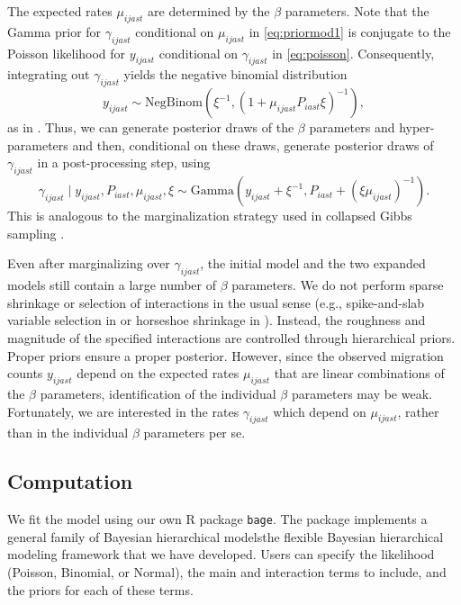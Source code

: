 \documentclass{article}
\begin{document}
{\color{magenta}The expected rates $\mu_{ijast}$ are determined by the $\beta$ parameters. Note that the Gamma prior for 
$\gamma_{ijast}$ conditional on $\mu_{ijast}$ in \eqref{eq:priormod1} is conjugate to the Poisson likelihood for $y_{ijast}$ conditional on $\gamma_{ijast}$ in \eqref{eq:poisson}. Consequently, integrating out $\gamma_{ijast}$ yields the negative binomial distribution
\begin{equation}\label{eq:negbinom}
  y_{ijast} \sim \text{NegBinom}\left(\xi^{-1}, (1 + \mu_{ijast} P_{iast} \xi)^{-1}\right),
\end{equation}
as in \citet{norton2018sampling}. Thus, we can generate posterior draws of the $\beta$ parameters and hyper-parameters and then, conditional on these draws, generate posterior draws of $\gamma_{ijast}$ in a post-processing step, using
\begin{equation}\label{eq:generate_gamma}
  \gamma_{ijast} \mid y_{ijast}, P_{iast}, \mu_{ijast}, \xi \sim \text{Gamma}\left(y_{ijast} + \xi^{-1}, P_{iast} + (\xi \mu_{ijast})^{-1}\right).
\end{equation}
This is analogous to the marginalization strategy used in collapsed Gibbs sampling \citep{liu1994collapsed}.}

{\color{magenta}Even after marginalizing over $\gamma_{ijast}$, the initial model and the two expanded models still contain a large number of $\beta$ parameters. We do not perform sparse shrinkage or selection of interactions in the usual sense (e.g., spike-and-slab variable selection in \cite{george1993variable} or horseshoe shrinkage in \cite{carvalho2010horseshoe}). Instead, the roughness and magnitude of the specified interactions are controlled through hierarchical priors. Proper priors ensure a proper posterior. However, since the observed migration counts $y_{ijast}$ depend on the expected rates $\mu_{ijast}$  that are linear combinations of the $\beta$ parameters,  identification of the individual $\beta$ parameters may be weak.  Fortunately, we are interested in the rates $\gamma_{ijast}$ which depend on $\mu_{ijast}$, rather than in the individual $\beta$ parameters per se. 
} 

\subsection{Computation}

We fit the model using our own R package \texttt{bage}. The package implements {\color{yellow}a general family of Bayesian hierarchical models}{\color{magenta}the flexible Bayesian hierarchical modeling framework that we have developed}. Users can specify the likelihood (Poisson, Binomial, or Normal), the main and interaction terms to include, and the priors for each of these terms.
\end{document}
